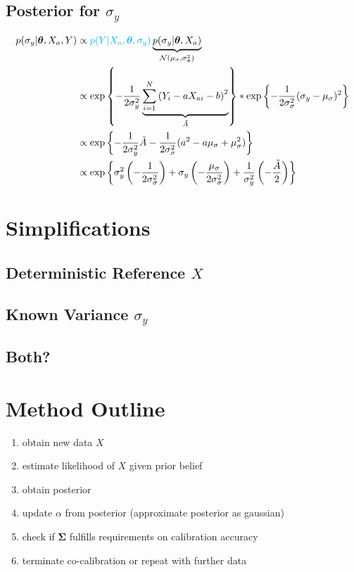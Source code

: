 \documentclass[10pt]{article}
\renewcommand{\vec}[1]{\boldsymbol{#1}}
\newcommand{\mat}[1]{\boldsymbol{#1}}
\begin{document}
\subsection{Posterior for $\sigma_y$}
\begin{align}
    p(\sigma_y | \vec{\theta}, X_a, Y) &\propto {\color{cyan} p(Y | X_a, \vec{\theta}, \sigma_y)} \underbrace{p(\sigma_y | \vec{\theta}, X_a)}_{\mathcal{N}(\mu_{\sigma}, \sigma_{\sigma}^2)} \\
    &\propto \exp\left\{ - \frac{1}{2\sigma_y^2} \underbrace{\sum_{i=1}^N \left( Y_i - a X_{ai} - b \right)^2}_{\tilde{A}} \right\} * \exp\left\{ - \frac{1}{2\sigma_{\sigma}^2} ( \sigma_y - \mu_{\sigma} )^2 \right\} \\
    &\propto \exp\left\{ - \frac{1}{2\sigma_y^2} \tilde{A} - \frac{1}{2\sigma_{\sigma}^2} ( a^2 - a \mu_{\sigma} + \mu_{\sigma}^2 ) \right\} \\
    &\propto \exp\left\{ \sigma_y^2 \left( - \frac{1}{2\sigma_{\sigma}^2} \right) + \sigma_y \left( -  \frac{\mu_{\sigma}}{2\sigma_{\sigma}^2}\right) + \frac{1}{\sigma_y^2} \left( - \frac{\tilde{A}}{2} \right) \right\} 
\end{align}

    
\section{Simplifications}

\subsection{Deterministic Reference $X$}

\subsection{Known Variance $\sigma_y$}

\subsection{Both?}


\section{Method Outline}
\begin{enumerate}
    \item obtain new data $X$
    \item estimate likelihood of $X$ given prior belief
    \item obtain posterior
    \item update $\alpha$ from posterior (approximate posterior as gaussian)
    \item check if $\mat{\Sigma}$ fulfills requirements on calibration accuracy
    \item terminate co-calibration or repeat with further data
\end{enumerate}
\end{document}
